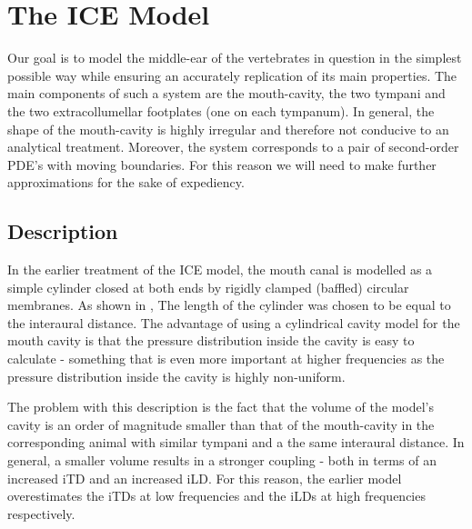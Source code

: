 \chapter{The ICE Model}

Our goal is to model the
middle-ear of the vertebrates in question in the simplest possible way while ensuring an accurately replication of its main properties. 
The main components of such a 
system are the mouth-cavity, the two tympani and the two extracollumellar
footplates (one on each tympanum). In general, the shape of the mouth-cavity is highly irregular and therefore
not conducive to an analytical treatment. Moreover, the system corresponds to a pair of second-order PDE's with
moving boundaries. For this reason we will need to make further approximations for the sake of expediency.

\section{Description}
In the earlier treatment of the ICE model, the mouth canal is modelled as a simple cylinder closed at 
both ends by rigidly clamped (baffled) circular membranes. As shown in \cite{vossenthesis}, The length of the cylinder was chosen to be equal
to the interaural distance. The advantage of using a cylindrical cavity model for the mouth cavity is that the pressure
distribution inside the cavity is easy to calculate - something that is even more important at higher frequencies
as the pressure distribution inside the cavity is highly non-uniform. 

The problem with this description is the fact that the volume of the model's cavity 
is an order of magnitude smaller than that of the mouth-cavity in the corresponding animal with similar
tympani and a the same interaural distance. In general, a smaller volume results in a stronger coupling - both in terms of an increased iTD and an increased
iLD. For this reason, the earlier model overestimates the iTDs at low frequencies and the iLDs at
high frequencies respectively.

